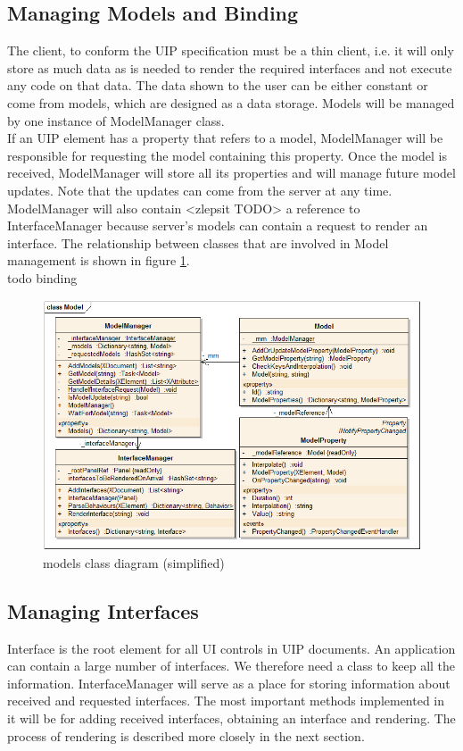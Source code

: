 \subsection{Managing Models and Binding}
The client, to conform the UIP specification must be a thin client, i.e. it will only store as much data as is needed to render the required interfaces and not execute any code on that data. The data shown to the user can be either constant or come from models, which are designed as a data storage. Models will be managed by one instance of ModelManager class.\\
If an UIP element has a property that refers to a model, ModelManager will be responsible for requesting the model containing this property. Once the model is received, ModelManager will store all its properties and will manage future model updates. Note that the updates can come from the server at any time. ModelManager will also contain <zlepsit TODO> a reference to InterfaceManager because server's models can contain a request to render an interface. The relationship between classes that are involved in Model management is shown in figure \ref{fig:classModel}.
\\
todo binding
\\
\begin{figure}[ht!]
\centering
\includegraphics[width=145mm]{pics/3/classModel.png}
\caption{models class diagram (simplified)}
\label{fig:classModel}
\end{figure}


\subsection{Managing Interfaces}
Interface is the root element for all UI controls in UIP documents. An application can contain a large number of interfaces. We therefore need a class to keep all the information. InterfaceManager will serve as a place for storing information about received and requested interfaces. The most important methods implemented in it will be for adding received interfaces, obtaining an interface and rendering. The process of rendering is described more closely in the next section.


